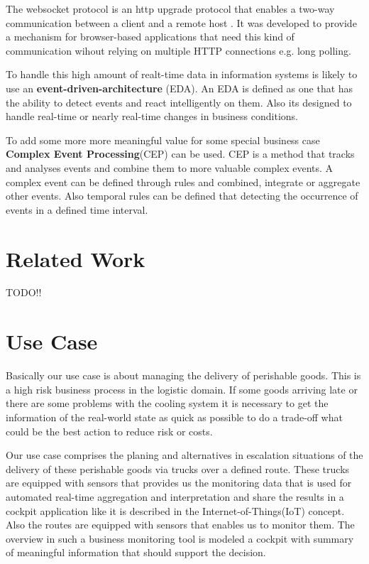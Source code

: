 \documentclass{acm_proc_article-sp}
\begin{document}
The websocket protocol is an http upgrade protocol that enables a two-way communication between a client and a remote host \cite{websocket}. It was developed to provide a mechanism for browser-based applications that need this kind of communication wihout relying on multiple HTTP connections e.g. long polling\cite{long_polling}. 

To handle this high amount of realt-time data in information systems is likely to use an \textbf{event-driven-architecture} (EDA). An EDA is defined as one that has the ability to detect events and react intelligently on them. Also its designed to handle real-time or nearly real-time changes in business conditions.\cite{EDA:Taylor}

To add some more more meaningful value for some special business case \textbf{Complex Event Processing}(CEP) can be used. CEP is a method that tracks and analyses events and combine them to more valuable complex events. A complex event can be defined through rules and combined, integrate or aggregate other events. Also temporal rules can be defined that detecting the occurrence of events in a defined time interval.

\section{Related Work}
\label{sec:Related Work}

TODO!!

\section{Use Case}
\label{sec:Use Case}

Basically our use case is about managing the delivery of perishable goods. This is a high risk business process in the logistic domain. If some goods arriving late or there are some problems with the cooling system it is necessary to get the information of the real-world state as quick as possible to do a trade-off what could be the best action to reduce risk or costs.

Our use case comprises the planing and alternatives in escalation situations of the delivery of these perishable goods via trucks over a defined route. These trucks are equipped with sensors that provides us the monitoring data that is used for automated real-time aggregation and interpretation and share the results in a cockpit application like it is described in the Internet-of-Things(IoT) concept. 
Also the routes are equipped with sensors that enables us to monitor them.
The overview in such a business monitoring tool is modeled a cockpit with summary of meaningful information that should support the decision. 
\end{document}
